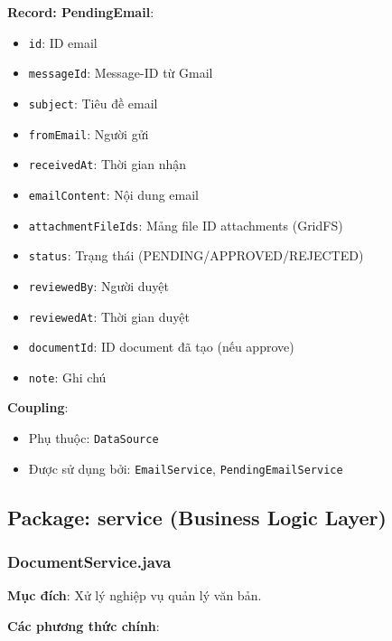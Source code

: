 \documentclass[12pt,a4paper]{article}
\begin{document}
\textbf{Record: PendingEmail}:
\begin{itemize}
    \item \texttt{id}: ID email
    \item \texttt{messageId}: Message-ID từ Gmail
    \item \texttt{subject}: Tiêu đề email
    \item \texttt{fromEmail}: Người gửi
    \item \texttt{receivedAt}: Thời gian nhận
    \item \texttt{emailContent}: Nội dung email
    \item \texttt{attachmentFileIds}: Mảng file ID attachments (GridFS)
    \item \texttt{status}: Trạng thái (PENDING/APPROVED/REJECTED)
    \item \texttt{reviewedBy}: Người duyệt
    \item \texttt{reviewedAt}: Thời gian duyệt
    \item \texttt{documentId}: ID document đã tạo (nếu approve)
    \item \texttt{note}: Ghi chú
\end{itemize}

\textbf{Coupling}:
\begin{itemize}
    \item Phụ thuộc: \texttt{DataSource}
    \item Được sử dụng bởi: \texttt{EmailService}, \texttt{PendingEmailService}
\end{itemize}

\subsection{Package: service (Business Logic Layer)}

\subsubsection{DocumentService.java}
\textbf{Mục đích}: Xử lý nghiệp vụ quản lý văn bản.

\textbf{Các phương thức chính}:
\end{document}
